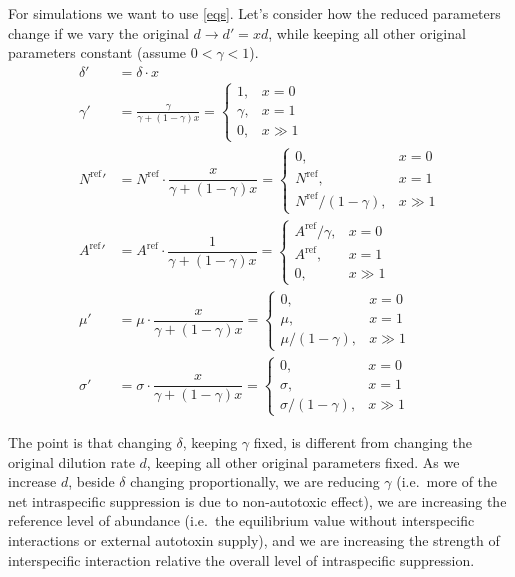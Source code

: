 \documentclass{article}
\begin{document}
For simulations we want to use \eqref{eqs}. Let's consider how the reduced parameters change if we vary the original $d \to d' = x d$, while keeping all other original parameters constant (assume $0  <\gamma < 1$).
\begin{align}
    \delta' &= \delta \cdot x \\
    \gamma' &= \frac{\gamma}{\gamma + (1 - \gamma) x} = \begin{cases}
        1,& x = 0 \\
        \gamma, & x = 1 \\
        0, & x \gg 1
    \end{cases} \\
    {N^\text{ref}}' &= N^\text{ref} \cdot \dfrac{x}{\gamma + (1-\gamma) x} = \begin{cases}
        0,& x = 0 \\
        N^\text{ref}, & x = 1 \\
        N^\text{ref} / (1 - \gamma), & x \gg 1
    \end{cases} \\
    {A^\text{ref}}' &= A^\text{ref} \cdot \dfrac{1}{\gamma + (1-\gamma) x} = \begin{cases}
        A^\text{ref}/\gamma,& x = 0 \\
        A^\text{ref}, & x = 1 \\
        0, & x \gg 1
    \end{cases} \\
    \mu' &=  \mu \cdot \dfrac{x}{\gamma + (1-\gamma) x} = \begin{cases}
        0,& x = 0 \\
        \mu, & x = 1 \\
        \mu / (1 - \gamma), & x \gg 1
    \end{cases}\\
    \sigma' &= \sigma \cdot \dfrac{x}{\gamma + (1-\gamma) x} = \begin{cases}
        0,& x = 0 \\
        \sigma, & x = 1 \\
        \sigma / (1 - \gamma), & x \gg 1
    \end{cases}
\end{align}

The point is that changing $\delta$, keeping $\gamma$ fixed, is different from changing the original dilution rate $d$, keeping all other original parameters fixed. As we increase $d$, beside $\delta$ changing proportionally, we are reducing $\gamma$ (i.e.\ more of the net intraspecific suppression is due to non-autotoxic effect), we are increasing the reference level of abundance (i.e.\ the equilibrium value without interspecific interactions or external autotoxin supply), and we are increasing the strength of interspecific interaction relative the overall level of intraspecific suppression. 
\end{document}
